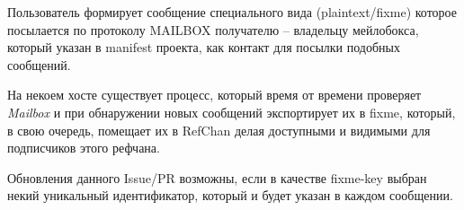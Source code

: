 \documentclass[11pt,a4paper]{article}
\newcommand{\term}[2]{\textit{#2}}
\newcommand{\Mailbox}{\term{mailbox}{Mailbox}}
\begin{document}
Пользователь формирует сообщение специального вида (plaintext/fixme) которое
посылается по протоколу MAILBOX получателю -- владельцу мейлобокса, который
указан в manifest проекта, как контакт для посылки подобных сообщений.

На некоем хосте существует процесс, который время от времени проверяет
\Mailbox{} и при обнаружении новых сообщений экспортирует их в fixme,
который, в свою очередь, помещает их в RefChan делая доступными и видимыми
для подписчиков этого рефчана.

Обновления данного Issue/PR возможны, если в качестве fixme-key выбран некий
уникальный идентификатор, который и будет указан в каждом сообщении.
\end{document}
